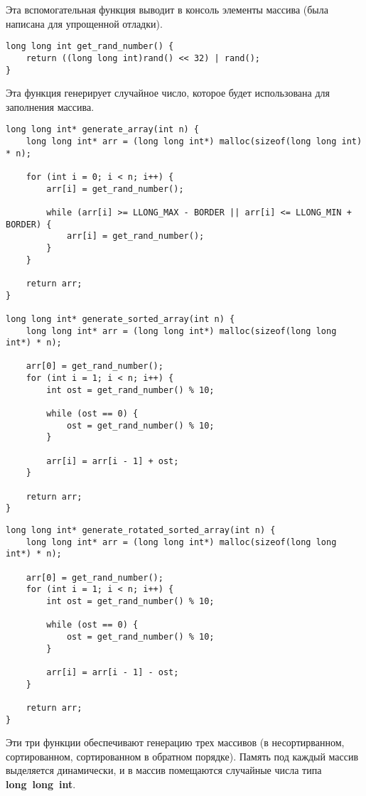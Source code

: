 \documentclass[a4paper,12pt,titlepage,finall]{article}
\begin{document}
Эта вспомогательная функция выводит в консоль элементы массива (была написана для упрощенной отладки).

\begin{verbatim}
long long int get_rand_number() {
    return ((long long int)rand() << 32) | rand();
}
\end{verbatim}

Эта функция генерирует случайное число, которое будет использована для заполнения массива.

\begin{verbatim}
long long int* generate_array(int n) {
    long long int* arr = (long long int*) malloc(sizeof(long long int) * n);

    for (int i = 0; i < n; i++) {
        arr[i] = get_rand_number();

        while (arr[i] >= LLONG_MAX - BORDER || arr[i] <= LLONG_MIN + BORDER) {
            arr[i] = get_rand_number();
        }
    }

    return arr;
}

long long int* generate_sorted_array(int n) {
    long long int* arr = (long long int*) malloc(sizeof(long long int*) * n);

    arr[0] = get_rand_number();
    for (int i = 1; i < n; i++) {
        int ost = get_rand_number() % 10;
        
        while (ost == 0) {
            ost = get_rand_number() % 10;
        }

        arr[i] = arr[i - 1] + ost;
    }

    return arr;
}
\end{verbatim}

\newpage

\begin{verbatim}
long long int* generate_rotated_sorted_array(int n) {
    long long int* arr = (long long int*) malloc(sizeof(long long int*) * n);

    arr[0] = get_rand_number();
    for (int i = 1; i < n; i++) {
        int ost = get_rand_number() % 10;
        
        while (ost == 0) {
            ost = get_rand_number() % 10;
        }

        arr[i] = arr[i - 1] - ost;
    }

    return arr;
}
\end{verbatim}

Эти три функции обеспечивают генерацию трех массивов (в несортирванном, сортированном, сортированном в обратном порядке).
Память под каждый массив выделяется динамически, и в массив помещаются случайные числа типа \textbf{long~long~int}.
\end{document}
